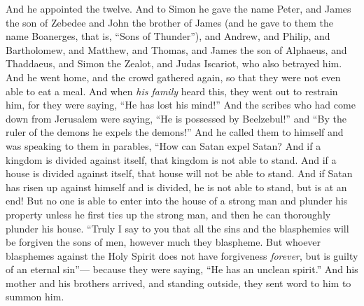\begin{biblechapter}
\verse And he appointed the twelve. And to Simon he gave the name Peter,
\verse and James the son of Zebedee and John the brother of James (and he gave to them the name Boanerges, that is, “Sons of Thunder”),
\verse and Andrew, and Philip, and Bartholomew, and Matthew, and Thomas, and James the son of Alphaeus, and Thaddaeus, and Simon the Zealot,
\verse and Judas Iscariot, who also betrayed him.
 And he went home, and the crowd gathered again, so that they were not even able to eat a meal.
\verse And when \textit{his family} heard this, they went out to restrain him, for they were saying, “He has lost his mind!”
\verse And the scribes who had come down from Jerusalem were saying, “He is possessed by Beelzebul!” and “By the ruler of the demons he expels the demons!”
\verse And he called them to himself and was speaking to them in parables, “How can Satan expel Satan?
\verse And if a kingdom is divided against itself, that kingdom is not able to stand.
\verse And if a house is divided against itself, that house will not be able to stand.
\verse And if Satan has risen up against himself and is divided, he is not able to stand, but is at an end!
\verse But no one is able to enter into the house of a strong man and plunder his property unless he first ties up the strong man, and then he can thoroughly plunder his house.
\verse “Truly I say to you that all the sins and the blasphemies will be forgiven the sons of men, however much they blaspheme.
\verse But whoever blasphemes against the Holy Spirit does not have forgiveness \textit{forever}, but is guilty of an eternal sin”—
\verse because they were saying, “He has an unclean spirit.”
 And his mother and his brothers arrived, and standing outside, they sent word to him to summon him.

\end{biblechapter}
